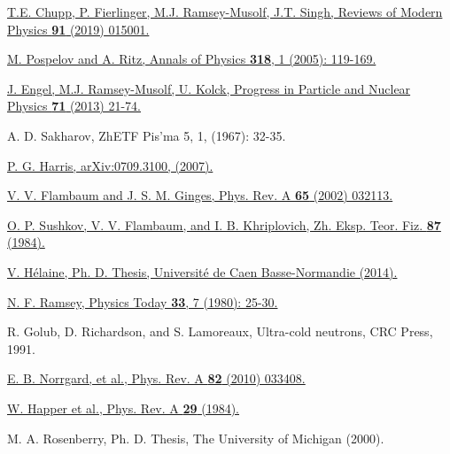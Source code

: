\begin{thebibliography}{99}

\href{https://journals.aps.org/rmp/abstract/10.1103/RevModPhys.91.015001}{T.E. Chupp, P. Fierlinger, M.J. Ramsey-Musolf, J.T. Singh, Reviews of Modern Physics \textbf{91} (2019) 015001.}

\href{https://www.sciencedirect.com/science/article/pii/S0003491605000539?via\%3Dihub}{M. Pospelov and A. Ritz, Annals of Physics \textbf{318}, 1 (2005): 119-169.  }

 \href{https://www.sciencedirect.com/science/article/pii/S0146641013000227?via\%3Dihub}{ J. Engel, M.J. Ramsey-Musolf, U. Kolck, Progress in Particle and Nuclear Physics \textbf{71} (2013) 21-74.}

 A. D. Sakharov, ZhETF Pis'ma 5, 1, (1967): 32-35.

\href{https://arxiv.org/pdf/0709.3100.pdf}{ P. G. Harris, arXiv:0709.3100, (2007).}

\href{https://journals.aps.org/pra/abstract/10.1103/PhysRevA.65.032113}{V. V. Flambaum and J. S. M. Ginges, Phys. Rev. A \textbf{65} (2002) 032113.}

\href{http://www.jetp.ac.ru/cgi-bin/e/index/e/60/5/p873?a=list}{O. P. Sushkov, V. V. Flambaum, and I. B. Khriplovich, Zh. Eksp. Teor. Fiz. \textbf{87} (1984).}


\href{https://tel.archives-ouvertes.fr/tel-01063399/document}{V. H\'elaine, Ph. D. Thesis, Universit\'e de Caen Basse-Normandie (2014).}

\href{https://physicstoday.scitation.org/doi/10.1063/1.2914161}{N. F. Ramsey, Physics Today \textbf{33}, 7 (1980): 25-30.}

 R. Golub, D. Richardson, and S. Lamoreaux, Ultra-cold neutrons, CRC Press, 1991. 

\href{https://journals.aps.org/pra/abstract/10.1103/PhysRevA.82.033408}{E. B. Norrgard, et al., Phys. Rev. A \textbf{82} (2010) 033408.}

 \href{https://journals.aps.org/pra/abstract/10.1103/PhysRevA.29.3092}{W. Happer et al., Phys. Rev. A \textbf{29} (1984).}

 M. A. Rosenberry, Ph. D. Thesis, The University of Michigan (2000).


\end{thebibliography}
